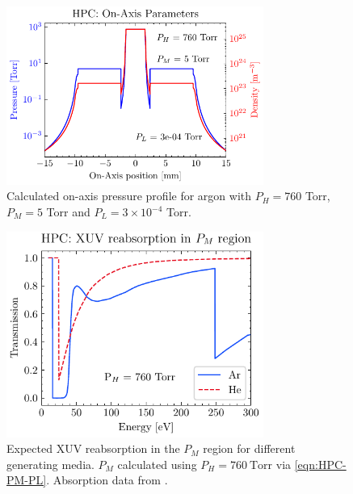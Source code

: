 \begin{figure}
	\centering
	\includegraphics[width=0.75\textwidth]{figures/chap3/HPC_on-axis-pressure.pdf}
	\caption{Calculated on-axis pressure profile for argon with $P_H = 760$ Torr, $P_M = 5$ Torr and $P_L = 3 \times 10^{-4}$ Torr.}
	\label{fig:HPC_on-axis-pressure}
\end{figure}

\begin{figure}
	\centering
	\includegraphics[width=0.75\textwidth]{figures/chap3/HPC_absorption.pdf}
	\caption{Expected XUV reabsorption in the $P_M$ region for different generating media. $P_M$ calculated using $P_H = 760 \ \textrm{Torr}$ via \cref{eqn:HPC-PM-PL}. Absorption data from \cite{gulliksonCXROXRayInteractions}.}
	\label{fig:HPC_absorption}
\end{figure}

